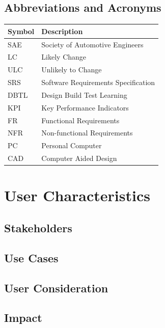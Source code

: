 \documentclass[12pt]{article}
\begin{document}
\subsection{Abbreviations and Acronyms}

\renewcommand{\arraystretch}{1.2}
\noindent \begin{longtable*}{l p{13cm}} 
  \toprule		
  \textbf{Symbol} & \textbf{Description}\\
  \midrule 
  SAE & Society of Automotive Engineers\\
  LC & Likely Change\\
  ULC & Unlikely to Change\\
  SRS & Software Requirements Specification\\
  DBTL & Design Build Test Learning\\
  KPI & Key Performance Indicators\\
  FR & Functional Requirements\\
  NFR & Non-functional Requirements\\
  PC & Personal Computer\\
  CAD & Computer Aided Design\\

  
  \bottomrule
\end{longtable*}


\section{User Characteristics}


\subsection{Stakeholders}


\subsection{Use Cases} 

\subsection{User Consideration}

\subsection{Impact}
\end{document}
